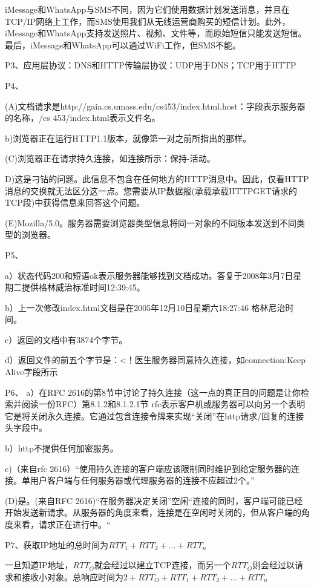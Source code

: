 \documentclass[11pt,UTF8,twoside]{article}
\begin{document}
	iMessage和WhatsApp与SMS不同，因为它们使用数据计划发送消息，并且在TCP/IP网络上工作，而SMS使用我们从无线运营商购买的短信计划。此外，iMessage和WhatsApp支持发送照片、视频、文件等，而原始短信只能发送短信。最后，iMessage和WhatsApp可以通过WiFi工作，但SMS不能。
	
	P3、应用层协议：DNS和HTTP传输层协议：UDP用于DNS；TCP用于HTTP
	
	P4、
	
	(A)文档请求是http://gaia.cs.umass.edu/cs453/index.html.host：字段表示服务器的名称，/cs 453/index.html表示文件名。
	
	b)浏览器正在运行HTTP1.1版本，就像第一对之前所指出的那样。
	
	(C)浏览器正在请求持久连接，如连接所示：保持-活动。
	
	D)这是刁钻的问题。此信息不包含在任何地方的HTTP消息中。因此，仅看HTTP消息的交换就无法区分这一点。您需要从IP数据报(承载承载HTTPGET请求的TCP段)中获得信息来回答这个问题。
	
	(E)Mozilla/5.0。服务器需要浏览器类型信息将同一对象的不同版本发送到不同类型的浏览器。
	
	P5、
	
	a）状态代码200和短语ok表示服务器能够找到文档成功。答复于2008年3月7日星期二提供格林威治标准时间12:39:45。
	
	b）上一次修改index.html文档是在2005年12月10日星期六18:27:46 格林尼治时间。
	
	c）返回的文档中有3874个字节。
	
	d）返回文件的前五个字节是：<！医生服务器同意持久连接，如connection:Keep Alive字段所示
	
	P6、
	a）在RFC 2616的第8节中讨论了持久连接（这一点的真正目的问题是让你检索并阅读一份RFC）第8.1.2和8.1.2.1节
	rfc表示客户机或服务器可以向另一个表明它是将关闭永久连接。它通过包含连接令牌来实现“关闭”在http请求/回复的连接头字段中。
	
	b）http不提供任何加密服务。
	
	c)（来自rfc 2616）“使用持久连接的客户端应该限制同时维护到给定服务器的连接。单用户客户端与任何服务器或代理服务器的连接不应超过2个。”
	
	(D)是。(来自RFC 2616)“在服务器决定关闭”空闲“连接的同时，客户端可能已经开始发送新请求。从服务器的角度来看，连接是在空闲时关闭的，但从客户端的角度来看，请求正在进行中。“
	
	P7、获取IP地址的总时间为$RTT_1+RTT_2+...+RTT_n$
	
	一旦知道IP地址，$RTT_O$就会经过以建立TCP连接，而另一个$RTT_O$则会经过以请求和接收小对象。总响应时间为$2+RTT_O+RTT_1+RTT_2+...+RTT_n$
	
\end{document}
